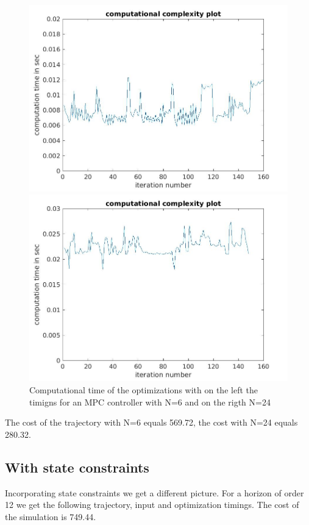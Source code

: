 \documentclass[•]{article}
\begin{document}
\begin{figure}[H]
\begin{minipage}{.45\textwidth}
\includegraphics[width = \textwidth]{comptime6.jpg}
\end{minipage}
\begin{minipage}{.45\textwidth}
\includegraphics[width = \textwidth]{comptime24.jpg}
\end{minipage}
\caption{Computational time of the optimizations with on the left the timigns for an MPC controller with N=6 and on the rigth N=24}
\end{figure}

The cost of the trajectory with N=6 equals 569.72, the cost with N=24 equals 280.32. 

\subsection{With state constraints}
Incorporating state constraints we get a different picture. For a horizon of order 12 we get the following trajectory, input and optimization timings. The cost of the simulation is 749.44.
\end{document}
